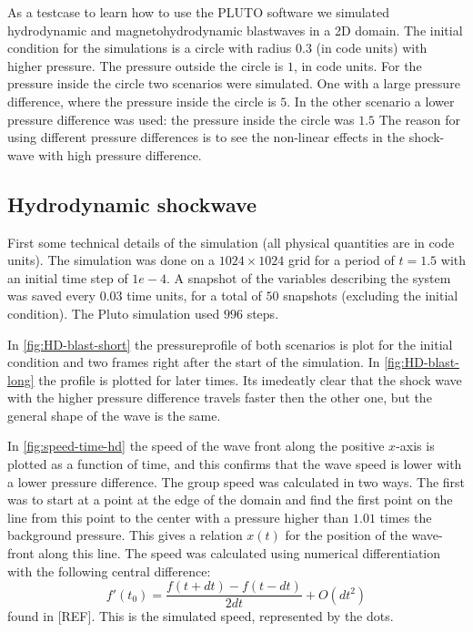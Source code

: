 As a testcase to learn how to use the PLUTO software we simulated hydrodynamic and magnetohydrodynamic blastwaves in a 2D domain. The initial condition for the simulations is a circle with radius $0.3$ (in code units) with higher pressure.
The pressure outside the circle is $1$, in code units. For the pressure inside the circle two scenarios were simulated.
One with a large pressure difference, where the pressure inside the circle is $5$. In the other scenario a lower pressure difference was used: the pressure inside the circle was $1.5$
The reason for using different pressure differences is to see the non-linear effects in the shock-wave with high pressure difference.

\subsection{Hydrodynamic shockwave}
First some technical details of the simulation (all physical quantities are in code units).
The simulation was done on a $1024 \times 1024$ grid for a period of $t=1.5$ with an initial time step of $1e-4$.
A snapshot of the variables describing the system was saved every $0.03$ time units, for a total of $50$ snapshots (excluding the initial condition).
The Pluto simulation used $996$ steps.

In \autoref{fig:HD-blast-short} the pressureprofile of both scenarios is plot for the initial condition and two frames right after the start of the simulation.
In \autoref{fig:HD-blast-long} the profile is plotted for later times.
Its imedeatly clear that the shock wave with the higher pressure difference travels faster then the other one, but the general shape of the wave is the same.

In \autoref{fig:speed-time-hd} the speed of the wave front along the positive $x$-axis is plotted as a function of time, and this confirms that the wave speed is lower with a lower pressure difference.
The group speed was calculated in two ways. The first was to start at a point at the edge of the domain and find the first point on the line from this point to the center with a pressure higher than $1.01$ times the background pressure.
This gives a relation $x(t)$ for the position of the wave-front along this line.
The speed was calculated using numerical differentiation with the following central difference:
\begin{equation*}
	f'(t_0) = \frac{f(t+dt)-f(t-dt)}{2dt} + O(dt^2)
\end{equation*}
found in [REF]. This is the simulated speed, represented by the dots. 

